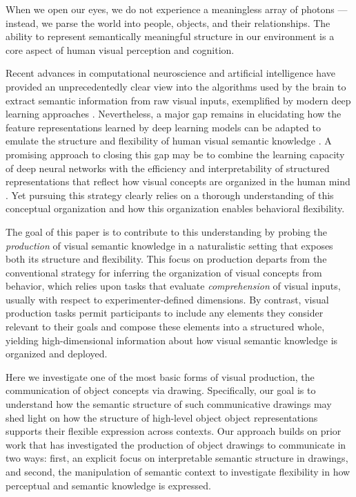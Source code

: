 \documentclass[10pt,letterpaper]{article}
\begin{document}
When we open our eyes, we do not experience a meaningless array of photons --- instead, we parse the world into people, objects, and their relationships. 
The ability to represent semantically meaningful structure in our environment is a core aspect of human visual perception and cognition. 

Recent advances in computational neuroscience and artificial intelligence have provided an unprecedentedly clear view into the algorithms used by the brain to extract semantic information from raw visual inputs, exemplified by modern deep learning approaches \cite{yamins2014performance}.
Nevertheless, a major gap remains in elucidating how the feature representations learned by deep learning models can be adapted to emulate the structure and flexibility of human visual semantic knowledge \cite{lake2017building}.
A promising approach to closing this gap may be to combine the learning capacity of deep neural networks with the efficiency and interpretability of structured representations that reflect how visual concepts are organized in the human mind \cite{battaglia2018relational}. 
Yet pursuing this strategy clearly relies on a thorough understanding of this conceptual organization and how this organization enables behavioral flexibility.  

The goal of this paper is to contribute to this understanding by probing the \textit{production} of visual semantic knowledge in a naturalistic setting that exposes both its structure and flexibility.
This focus on production departs from the conventional strategy for inferring the organization of visual concepts from behavior, which relies upon tasks that evaluate \textit{comprehension} of visual inputs, usually with respect to experimenter-defined dimensions. 
By contrast, visual production tasks permit participants to include any elements they consider relevant to their goals and compose these elements into a structured whole, yielding high-dimensional information about how visual semantic knowledge is organized and deployed. 

Here we investigate one of the most basic forms of visual production, the communication of object concepts via drawing.
Specifically, our goal is to understand how the semantic structure of such communicative drawings may shed light on how the structure of high-level object object representations supports their flexible expression across contexts. 
Our approach builds on prior work that has investigated the production of object drawings to communicate \cite{FanCommon2018} in two ways: first, an explicit focus on interpretable semantic structure in drawings, and second, the manipulation of semantic context to investigate flexibility in how perceptual and semantic knowledge is expressed. 
\end{document}
